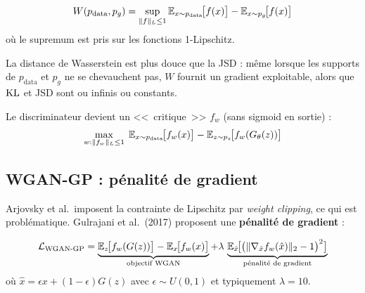 \begin{theoreme}
\begin{equation}
W(p_{\text{data}}, p_g) = \sup_{\|f\|_L \leq 1} \mathbb{E}_{x \sim p_{\text{data}}}\!\big[f(x)\big] - \mathbb{E}_{x \sim p_g}\!\big[f(x)\big]
\label{eq:kantorovich}
\end{equation}
o\`u le supremum est pris sur les fonctions 1-Lipschitz.
\end{theoreme}

\begin{intuition}
La distance de Wasserstein est plus douce que la JSD : m\^eme lorsque les supports de $p_{\text{data}}$ et $p_g$ ne se chevauchent pas, $W$ fournit un gradient exploitable, alors que $\mathrm{KL}$ et JSD sont ou infinis ou constants.
\end{intuition}

\begin{formules}[title=\textbf{Objectif WGAN}]
Le discriminateur devient un <<~critique~>> $f_w$ (sans sigmoid en sortie) :
\begin{equation}
\max_{w : \|f_w\|_L \leq 1} \; \mathbb{E}_{x \sim p_{\text{data}}}\!\big[f_w(x)\big] - \mathbb{E}_{z \sim p_z}\!\big[f_w(G_\theta(z))\big]
\label{eq:wgan-objective}
\end{equation}
\end{formules}

\subsection{WGAN-GP : p\'enalit\'e de gradient}
\label{sec:wgan-gp}

Arjovsky et al.\ imposent la contrainte de Lipschitz par \emph{weight clipping}, ce qui est probl\'ematique. Gulrajani et al.\ (2017) proposent une \textbf{p\'enalit\'e de gradient} :

\begin{formules}[title=\textbf{WGAN-GP}]
\begin{equation}
\mathcal{L}_{\text{WGAN-GP}} = \underbrace{\mathbb{E}_{z}\!\big[f_w(G(z))\big] - \mathbb{E}_{x}\!\big[f_w(x)\big]}_{\text{objectif WGAN}} + \lambda \,\underbrace{\mathbb{E}_{\hat{x}}\!\big[\big(\|\nabla_{\hat{x}} f_w(\hat{x})\|_2 - 1\big)^2\big]}_{\text{p\'enalit\'e de gradient}}
\label{eq:wgan-gp}
\end{equation}
o\`u $\hat{x} = \epsilon x + (1 - \epsilon) G(z)$ avec $\epsilon \sim U(0, 1)$ et typiquement $\lambda = 10$.
\end{formules}

